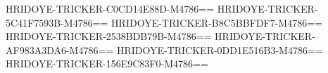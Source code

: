 HRIDOYE-TRICKER-C0CD14E88D-M4786==
HRIDOYE-TRICKER-5C41F7593B-M4786==
HRIDOYE-TRICKER-B8C5BBFDF7-M4786==
HRIDOYE-TRICKER-2538BDB79B-M4786==
HRIDOYE-TRICKER-AF983A3DA6-M4786==
HRIDOYE-TRICKER-0DD1E516B3-M4786==
HRIDOYE-TRICKER-156E9C83F0-M4786==
